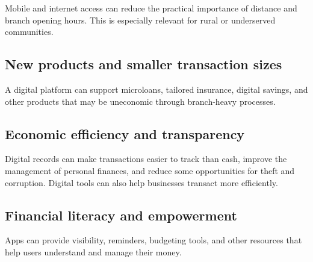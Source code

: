 Mobile and internet access can reduce the practical importance of distance and branch opening hours. This is especially relevant for rural or underserved communities.

\subsection{New products and smaller transaction sizes}

A digital platform can support microloans, tailored insurance, digital savings, and other products that may be uneconomic through branch-heavy processes.

\subsection{Economic efficiency and transparency}

Digital records can make transactions easier to track than cash, improve the management of personal finances, and reduce some opportunities for theft and corruption. Digital tools can also help businesses transact more efficiently.

\subsection{Financial literacy and empowerment}

Apps can provide visibility, reminders, budgeting tools, and other resources that help users understand and manage their money.

\begin{mlfigure}
\end{mlfigure}

